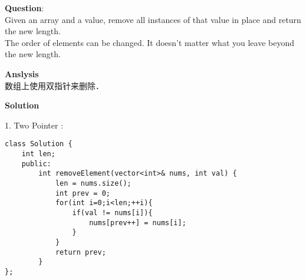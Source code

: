 \begin{description}
    \item{\textbf{Question}}:\\%
		Given an array and a value, remove all instances of that value in place and return the new length.\\
		The order of elements can be changed. It doesn't matter what you leave beyond the new length.\\

    \item{\textbf{Anslysis}}\\
		数组上使用双指针来删除．\\

    \item{\textbf{Solution}}\\
	\item{1. Two Pointer} : \\
		\begin{lstlisting}
class Solution {
	int len;
	public:
		int removeElement(vector<int>& nums, int val) {
			len = nums.size();
			int prev = 0;
			for(int i=0;i<len;++i){
				if(val != nums[i]){
					nums[prev++] = nums[i];
				}
			}
			return prev;
		}
};
		\end{lstlisting}
\end{description}

